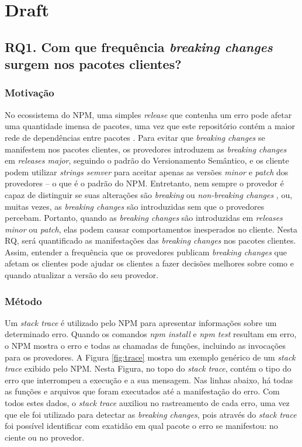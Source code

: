 \chapter{Draft}

\section{RQ1. Com que frequência \textit{breaking changes} surgem nos pacotes clientes?}
\label{sec:rq1}

\subsection{Motivação}
\label{mot:rq1}

No ecossistema do \gls{NPM}, uma simples \textit{release} que contenha um erro pode afetar uma quantidade imensa de pacotes, uma vez que este repositório contém a maior rede de dependências entre pacotes \cite{teorical_reference:npm_2}. Para evitar que \textit{breaking changes} se manifestem nos pacotes clientes, os provedores introduzem as \textit{breaking changes} em \textit{releases major}, seguindo o padrão do Versionamento Semântico, e os cliente podem utilizar \textit{strings semver} para aceitar apenas as versões \textit{minor} e \textit{patch} dos provedores -- o que é o padrão do \gls{NPM}. Entretanto, nem sempre o provedor é capaz de distinguir se suas alterações são \textit{breaking} ou \textit{non-breaking changes} \cite{noregrets2018}, ou, muitas vezes, as \textit{breaking changes} são introduzidas sem que o provedores percebam. Portanto, quando as \textit{breaking changes} são introduzidas em \textit{releases minor} ou \textit{patch}, elas podem causar comportamentos inesperados no cliente. Nesta RQ, será quantificado as manifestações das \textit{breaking changes} nos pacotes clientes. Assim, entender a frequência que os provedores publicam \textit{breaking changes} que afetam os clientes pode ajudar os clientes a fazer decisões melhores sobre como e quando atualizar a versão do seu provedor.

\subsection{Método}
\label{apr:rq1}

Um \textit{stack trace} é utilizado pelo \gls{NPM} para apresentar informações sobre um determinado erro. Quando os comandos \textit{npm install} e \textit{npm test} resultam em erro, o \Gls{NPM} mostra o erro e todas as chamadas de funções, incluindo as invocações para os provedores. A Figura \ref{fig:trace} mostra um exemplo genérico de um \textit{stack trace} exibido pelo \Gls{NPM}. Nesta Figura, no topo do \textit{stack trace}, contém o tipo do erro que interrompeu a execução e a sua mensagem. Nas linhas abaixo, há todas as funções e arquivos que foram executados até a manifestação do erro. Com todos estes dados, o \textit{stack trace} auxiliou no rastreamento de cada erro, uma vez que ele foi utilizado para detectar as \textit{breaking changes}, pois através do \textit{stack trace} foi possível identificar com exatidão em qual pacote o erro se manifestou: no ciente ou no provedor.

